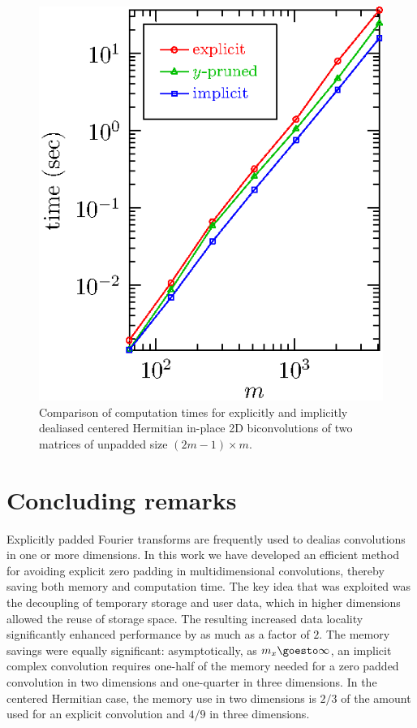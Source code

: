 \documentclass[final]{siamltex}
\begin{document}
\begin{figure}[htbp]
\begin{center}
\begin{minipage}{0.49\linewidth}
\begin{center}
\includegraphics{timing2b}
\caption{Comparison of computation times for explicitly and implicitly
dealiased centered Hermitian in-place 2D biconvolutions of two matrices of
unpadded size $(2m-1)\times m$.}
\label{timing2b}
\end{center}
\end{minipage}
\end{center}
\end{figure}

\section{Concluding remarks}
Explicitly padded Fourier transforms are frequently used to dealias
convolutions in one or more dimensions.
In this work we have developed an efficient method for avoiding explicit zero
padding in multidimensional convolutions, thereby saving both memory and
computation time. The key idea that was exploited was the decoupling
of temporary storage and user data, which in higher dimensions allowed
the reuse of storage space. The resulting increased data locality
significantly enhanced performance by as much as a factor of $2$.
The memory savings were equally significant: asymptotically, as
$m_x\goesto\infty$, an implicit complex convolution requires one-half of
the memory needed for a zero padded convolution in two dimensions and
one-quarter in three dimensions. In the centered Hermitian case, the memory
use in two dimensions is $2/3$ of the amount used for an explicit
convolution and $4/9$ in three dimensions. 
\end{document}
